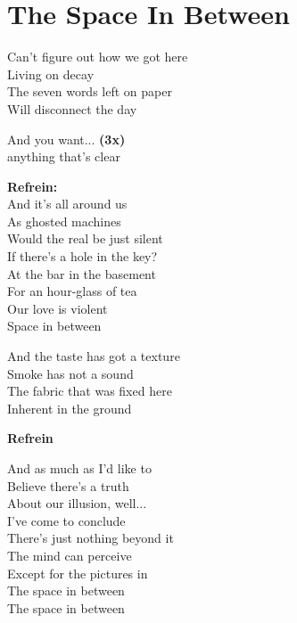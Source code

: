 \section{The Space In Between}
Can't figure out how we got here\\
Living on decay\\
The seven words left on paper\\
Will disconnect the day

And you want... \textbf{(3x)}\\
anything that's clear

\textbf{Refrein:}\\
And it's all around us\\
As ghosted machines\\
Would the real be just silent\\
If there's a hole in the key?\\
At the bar in the basement\\
For an hour-glass of tea\\
Our love is violent\\
Space in between

And the taste has got a texture\\
Smoke has not a sound\\
The fabric that was fixed here\\
Inherent in the ground

\textbf{Refrein}

And as much as I'd like to\\
Believe there's a truth\\
About our illusion, well...\\
I've come to conclude\\
There's just nothing beyond it\\
The mind can perceive\\
Except for the pictures in\\
The space in between\\
The space in between
